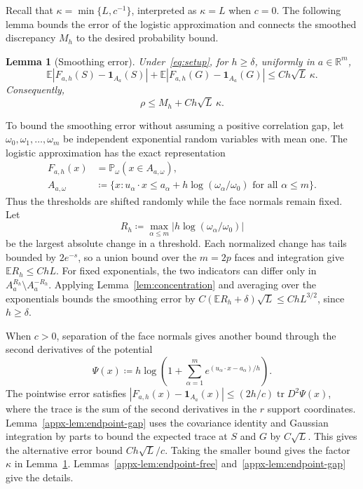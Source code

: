 \documentclass[11pt,letterpaper]{article}
\newtheorem{lemma}{Lemma}
\theoremstyle{remark}
\newcommand{\E}{\mathbb E}
\newcommand{\Pp}{\mathbb P}
\newcommand{\R}{\mathbb R}
\newcommand{\tr}{\operatorname{tr}}
\newcommand{\ind}{\mathbf 1}
\begin{document}
Recall that \(\kappa=\min\{L,c^{-1}\}\), interpreted as
\(\kappa=L\) when \(c=0\). The following lemma bounds the error
of the logistic approximation and connects the smoothed discrepancy
\(M_h\) to the desired probability bound.
\begin{lemma}[Smoothing error]\label{lem:endpoint}
Under~\eqref{eq:setup}, for \(h\ge\delta\), uniformly in
\(a\in\R^m\),
\begin{equation}
 \E|F_{a,h}(S)-\ind_{A_a}(S)|+
 \E|F_{a,h}(G)-\ind_{A_a}(G)|\le Ch\sqrt L\,\kappa.
 \label{eq:endpoint-error}
\end{equation}
Consequently,
\begin{equation}
 \rho\le M_h+Ch\sqrt L\,\kappa.
 \label{eq:endpoint-min}
\end{equation}
\end{lemma}

To bound the smoothing error without assuming a positive correlation
gap, let \(\omega_0,\omega_1,\ldots,\omega_m\) be independent
exponential random variables with mean one. The logistic approximation
has the exact representation
\begin{equation}
 \begin{split}
 F_{a,h}(x)&=\Pp_\omega(x\in A_{a,\omega}),\\
 A_{a,\omega}&\coloneqq\{x:u_\alpha\cdot x\le
 a_\alpha+h\log(\omega_\alpha/\omega_0)
                   \text{ for all }\alpha\le m\}.
 \end{split}
 \label{eq:mixture}
\end{equation}
Thus the thresholds are shifted randomly while the face normals
remain fixed. Let
\[
 R_h\coloneqq\max_{\alpha\le m}
             |h\log(\omega_\alpha/\omega_0)|
\]
be the largest absolute change in a threshold. Each normalized change
has tails bounded by \(2e^{-s}\), so a union bound over the
\(m=2p\) faces and integration give \(\E R_h\le ChL\).
For fixed exponentials, the two indicators can differ only in
\(A_a^{R_h}\setminus A_a^{-R_h}\). Applying
Lemma~\ref{lem:concentration} and averaging over the exponentials
bounds the smoothing error by
\(C(\E R_h+\delta)\sqrt L\le ChL^{3/2}\), since \(h\ge\delta\).

When \(c>0\), separation of the face normals gives another bound
through the second derivatives of the potential
\[
 \Psi(x)\coloneqq h\log\!\left(1+\sum_{\alpha=1}^m
                         e^{(u_\alpha\cdot x-a_\alpha)/h}\right).
\]
The pointwise error satisfies
\( |F_{a,h}(x)-\ind_{A_a}(x)|\le(2h/c)\tr D^2\Psi(x)\),
where the trace is the sum of the second derivatives in the
\(r\) support coordinates. Lemma~\ref{appx-lem:endpoint-gap}
uses the covariance identity and Gaussian integration by parts to
bound the expected trace at \(S\) and \(G\) by \(C\sqrt L\).
This gives the alternative error bound \(Ch\sqrt L/c\).
Taking the smaller bound gives the factor \(\kappa\) in
Lemma~\ref{lem:endpoint}. Lemmas~\ref{appx-lem:endpoint-free}
and~\ref{appx-lem:endpoint-gap} give the details.
\end{document}
